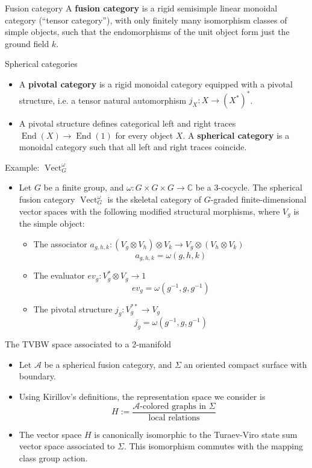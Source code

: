 \documentclass{beamer}
\DeclareMathOperator{\End}{End}
\DeclareMathOperator{\Vect}{Vect}
\begin{document}
\begin{frame}{Fusion category}
A \textbf{fusion category} is a rigid semisimple linear monoidal category (“tensor category”), with only finitely many isomorphism classes of simple objects, such that the endomorphisms of the unit object form just the ground field $k$.
\end{frame}

\begin{frame}{Spherical categories}
\begin{itemize}
\item A \textbf{pivotal category} is a rigid monoidal category equipped with
a pivotal structure, i.e. a tensor natural automorphism $j_X : X \to (X^*)^*$.  

\pause

\item A pivotal structure defines categorical left and right traces $\End(X) \to \End(1)$ for every object $X$. A \textbf{spherical category} is a monoidal category such that all left and right traces coincide.
\end{itemize}
\end{frame}

\begin{frame}{Example: $\Vect^\omega_G$}
\begin{itemize}
\item  Let $G$ be a finite group, and $\omega: G \times G \times G \to \mathbb{C}$ be a 3-cocycle. The spherical fusion category $\Vect^\omega_G$ is the skeletal category of $G$-graded finite-dimensional vector spaces with the following modified structural morphisms, where $V_g$ is the simple object:   
\begin{itemize} 
\item The associator $a_{g,h,k}:(V_g \otimes V_h) \otimes V_k \to V_g \otimes (V_h \otimes V_k)$
            $$ a_{g,h,k} = \omega(g,h,k)$$
\item The evaluator $ev_g:V_g^* \otimes V_g \to 1$
            $$ ev_g = \omega(g^{-1},g,g^{-1})$$
\item The pivotal structure $j_g:V_g^{**} \to V_g$
            $$ j_g = \omega(g^{-1},g,g^{-1})$$
\end{itemize}
\end{itemize}
\end{frame}


\begin{frame}{The TVBW space associated to a 2-manifold}
  \begin{itemize}
    \item Let $\mathcal A$ be a spherical fusion category, and $\Sigma$ an oriented compact surface with boundary.
    \item 
        Using Kirillov's definitions, the representation space we consider is
        \[
        H := \frac{\text{$\mathcal A$-colored graphs in $\Sigma$}  }
        {\text{local relations}}
       \]
    \pause
    \item The vector space $H$ is canonically isomorphic to the Turaev-Viro state sum vector space associated to $\Sigma$.  This isomorphism commutes with the mapping class group action.
   \end{itemize}
\end{frame}
\end{document}
